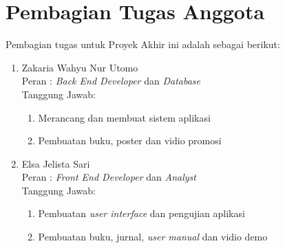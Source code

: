\section{Pembagian Tugas Anggota}
Pembagian tugas untuk Proyek Akhir ini adalah sebagai berikut:

\begin{enumerate}
	
\item	Zakaria Wahyu Nur Utomo \\
Peran	: \textit{Back End Developer} dan \textit{Database} \\
Tanggung Jawab:
\begin{enumerate}
\item	Merancang dan membuat sistem aplikasi
\item	Pembuatan buku, poster dan vidio promosi
\end{enumerate}
\item	Elsa Jelista Sari  \\
Peran	: \textit{Front End Developer} dan \textit{Analyst} \\
Tanggung Jawab: 
\begin{enumerate}
\item	Pembuatan \textit{user interface} dan pengujian aplikasi
\item	Pembuatan buku, jurnal, \textit{user manual} dan vidio demo
\end{enumerate}

\end{enumerate}
